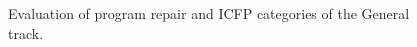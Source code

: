 \begin{figure}
	\noindent{}
	\caption{Evaluation of program repair and ICFP categories of the General track.}
	\label{fig:prog-rep-icfp}
\end{figure}

